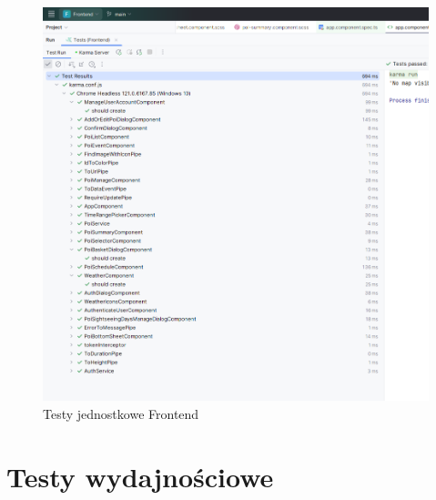\begin{figure}[H]
    \centering
    \includegraphics[width=1\textwidth]{attachments/testfrontend}
    \caption{Testy jednostkowe Frontend}
    \label{fig:testfronted}
\end{figure}

\section{Testy wydajnościowe}
\label{sec:testy-wydajnosciowe}

